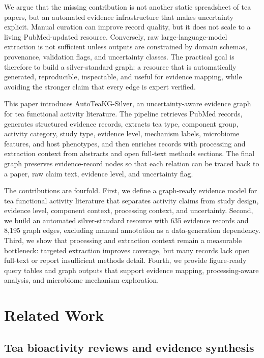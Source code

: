 \documentclass[11pt]{article}
\begin{document}
We argue that the missing contribution is not another static spreadsheet of tea papers, but an automated evidence infrastructure that makes uncertainty explicit. Manual curation can improve record quality, but it does not scale to a living PubMed-updated resource. Conversely, raw large-language-model extraction is not sufficient unless outputs are constrained by domain schemas, provenance, validation flags, and uncertainty classes. The practical goal is therefore to build a silver-standard graph: a resource that is automatically generated, reproducible, inspectable, and useful for evidence mapping, while avoiding the stronger claim that every edge is expert verified.

This paper introduces AutoTeaKG-Silver, an uncertainty-aware evidence graph for tea functional activity literature. The pipeline retrieves PubMed records, generates structured evidence records, extracts tea type, component group, activity category, study type, evidence level, mechanism labels, microbiome features, and host phenotypes, and then enriches records with processing and extraction context from abstracts and open full-text methods sections. The final graph preserves evidence-record nodes so that each relation can be traced back to a paper, raw claim text, evidence level, and uncertainty flag.

The contributions are fourfold. First, we define a graph-ready evidence model for tea functional activity literature that separates activity claims from study design, evidence level, component context, processing context, and uncertainty. Second, we build an automated silver-standard resource with 635 evidence records and 8,195 graph edges, excluding manual annotation as a data-generation dependency. Third, we show that processing and extraction context remain a measurable bottleneck: targeted extraction improves coverage, but many records lack open full-text or report insufficient methods detail. Fourth, we provide figure-ready query tables and graph outputs that support evidence mapping, processing-aware analysis, and microbiome mechanism exploration.

\section{Related Work}

\subsection{Tea bioactivity reviews and evidence synthesis}
\end{document}
